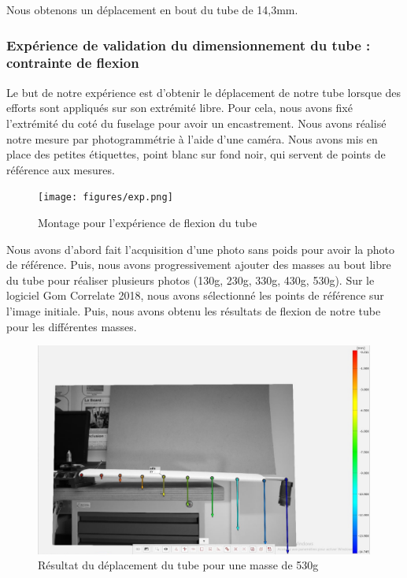 \documentclass[a4paper,12pt,french]{report}
\begin{document}
Nous obtenons un déplacement en bout du tube de 14,3mm.

\subsubsection{Expérience de validation du dimensionnement du tube : contrainte de flexion}

Le but de notre expérience est d'obtenir le déplacement de notre tube lorsque des efforts sont appliqués sur son extrémité libre. Pour cela, nous avons fixé l'extrémité du coté du fuselage pour avoir un encastrement. Nous avons réalisé notre mesure par photogrammétrie à l'aide d'une caméra. Nous avons mis en place des petites étiquettes, point blanc sur fond noir, qui servent de points de référence aux mesures.\newline
\begin{figure}[h]
    \centering
    \texttt{[image: figures/exp.png]}
    \caption{Montage pour l'expérience de flexion du tube}
    \label{mont}
\end{figure}
\newpage

Nous avons d'abord fait l'acquisition d'une photo sans poids pour avoir la photo de référence. Puis, nous avons progressivement ajouter des masses au bout libre du tube pour réaliser plusieurs photos (130g, 230g, 330g, 430g, 530g).  Sur le logiciel Gom Correlate 2018, nous avons sélectionné les points de référence sur l'image initiale. Puis, nous avons obtenu les résultats de flexion de notre tube pour les différentes masses.\newline

\begin{figure}[h]
    \centering
    \includegraphics[height=7cm]{figures/530.jpg}
    \caption{Résultat du déplacement du tube pour une masse de 530g}
    \label{dep}
\end{figure}
\end{document}
